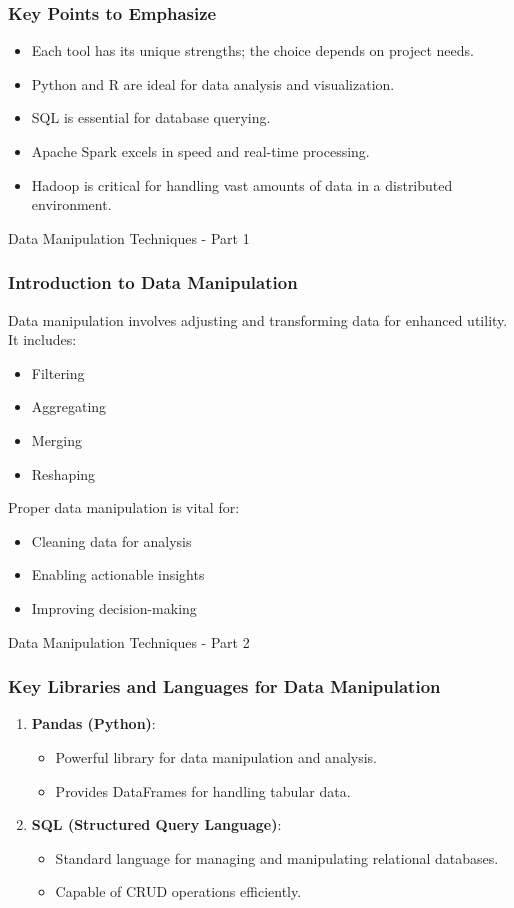 \documentclass[aspectratio=169]{beamer}
\begin{document}
\begin{frame}[fragile]
    \frametitle{Key Points to Emphasize}
    \begin{itemize}
        \item Each tool has its unique strengths; the choice depends on project needs.
        \item Python and R are ideal for data analysis and visualization.
        \item SQL is essential for database querying.
        \item Apache Spark excels in speed and real-time processing.
        \item Hadoop is critical for handling vast amounts of data in a distributed environment.
    \end{itemize}
\end{frame}

\begin{frame}{Data Manipulation Techniques - Part 1}
    \frametitle{Introduction to Data Manipulation}
    Data manipulation involves adjusting and transforming data for enhanced utility. It includes:
    \begin{itemize}
        \item Filtering
        \item Aggregating
        \item Merging
        \item Reshaping
    \end{itemize}
    Proper data manipulation is vital for:
    \begin{itemize}
        \item Cleaning data for analysis
        \item Enabling actionable insights
        \item Improving decision-making
    \end{itemize}
\end{frame}

\begin{frame}{Data Manipulation Techniques - Part 2}
    \frametitle{Key Libraries and Languages for Data Manipulation}
    \begin{enumerate}
        \item \textbf{Pandas (Python)}:
        \begin{itemize}
            \item Powerful library for data manipulation and analysis.
            \item Provides DataFrames for handling tabular data.
        \end{itemize}
        
        \item \textbf{SQL (Structured Query Language)}:
        \begin{itemize}
            \item Standard language for managing and manipulating relational databases.
            \item Capable of CRUD operations efficiently.
        \end{itemize}
    \end{enumerate}
\end{frame}
\end{document}
